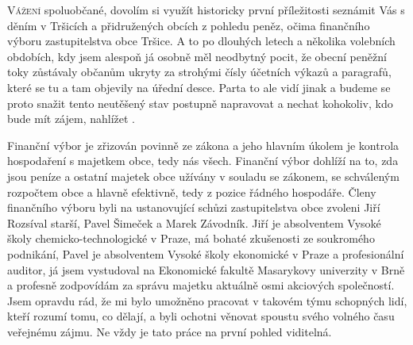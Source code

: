 \documentclass[11pt]{article}
\begin{document}
\closearticle

\begin{multicols}{2}{

\lettrine{V}{ážení} spoluobčané, dovolím si využít historicky první příležitosti seznámit Vás s děním v Tršicích a  přidružených obcích z pohledu peněz, očima finančního výboru zastupitelstva obce Tršice. A to po dlouhých letech a několika volebních obdobích, kdy jsem alespoň já osobně měl neodbytný pocit, že obecní peněžní toky zůstávaly občanům ukryty za strohými čísly účetních výkazů a paragrafů, které se tu a tam objevily na úřední desce. Parta  to ale vidí jinak a budeme se proto snažit tento neutěšený stav postupně napravovat a nechat kohokoliv, kdo bude mít zájem, nahlížet .

Finanční výbor je zřizován povinně ze zákona a jeho hlavním úkolem je kontrola hospodaření s majetkem obce, tedy nás všech. Finanční výbor dohlíží na to, zda jsou peníze a ostatní majetek obce užívány v souladu se zákonem, se schváleným rozpočtem obce a hlavně efektivně, tedy z pozice řádného hospodáře. Členy finančního výboru byli na ustanovující schůzi zastupitelstva obce zvoleni Jiří Rozsíval starší, Pavel Šimeček a Marek Závodník. Jiří je absolventem Vysoké školy chemicko-technologické v Praze, má bohaté zkušenosti ze soukromého podnikání, Pavel je absolventem Vysoké školy ekonomické v Praze a profesionální auditor, já jsem vystudoval na Ekonomické fakultě Masarykovy univerzity v Brně a profesně zodpovídám za správu majetku aktuálně osmi akciových společností. Jsem opravdu rád, že mi bylo umožněno pracovat v takovém týmu schopných lidí, kteří rozumí tomu, co dělají, a byli ochotni věnovat spoustu svého volného času veřejnému zájmu. Ne vždy je tato práce na první pohled viditelná.

}
\end{multicols}
\end{document}
